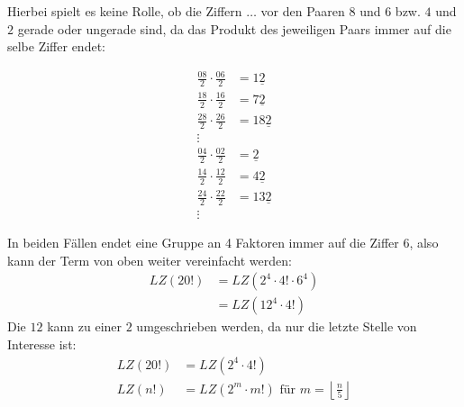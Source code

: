 \documentclass[12pt,a4paper,oneside]{article}
\newenvironment{Together}
{\vbox\bgroup}
{\egroup}
\begin{document}
\begin{Together}	
Hierbei spielt es keine Rolle, ob die Ziffern $\dots$ vor den Paaren $8$ und $6$ bzw. $4$ und $2$ gerade oder ungerade sind, da das Produkt des jeweiligen Paars immer auf die selbe Ziffer endet:
\begin{multicols}{2}
	\noindent
	\begin{equation*}
		\begin{split}
			\frac{08}{2} \cdot \frac{06}{2} &= 1\underline{2} \\
			\frac{18}{2} \cdot \frac{16}{2} &= 7\underline{2} \\
			\frac{28}{2} \cdot \frac{26}{2} &= 18\underline{2} \\
			\vdots
		\end{split}
	\end{equation*}
	\begin{equation*}
		\begin{split}
			\frac{04}{2} \cdot \frac{02}{2} &= \underline{2} \\
			\frac{14}{2} \cdot \frac{12}{2} &= 4\underline{2} \\
			\frac{24}{2} \cdot \frac{22}{2} &= 13\underline{2} \\
			\vdots
		\end{split}
	\end{equation*}
\end{multicols}
\end{Together}

In beiden Fällen endet eine Gruppe an 4 Faktoren immer auf die Ziffer $6$, also kann der Term von oben weiter vereinfacht werden:
\begin{equation*}
	\begin{split}
		LZ(20!) &= LZ\left(2^4 \cdot 4! \cdot 6^4\right) \\
		&= LZ\left(12^4 \cdot 4!\right)
	\end{split}
\end{equation*}
Die $12$ kann zu einer $2$ umgeschrieben werden, da nur die letzte Stelle von Interesse ist: \\
\begin{equation*}
	\begin{split}
		LZ(20!) &= LZ\left(2^4 \cdot 4!\right) \\
		LZ(n!) &= LZ\left(2^m \cdot m!\right) \text{ für } m = \left\lfloor\frac{n}{5}\right\rfloor
	\end{split}
\end{equation*}
\end{document}
